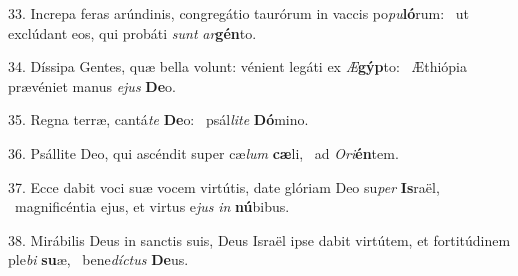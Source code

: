 33. Increpa feras arúndinis, congregátio taurórum in vaccis po\textit{pu}\textbf{ló}rum: \ast\  ut exclúdant eos, qui probáti \textit{sunt} \textit{ar}\textbf{gén}to.\

34. Díssipa Gentes, quæ bella volunt: vénient legáti ex \textit{Æ}\textbf{gýp}to: \ast\  Æthiópia prævéniet manus \textit{e}\textit{jus} \textbf{De}o.\

35. Regna terræ, cantá\textit{te} \textbf{De}o: \ast\  psál\textit{li}\textit{te} \textbf{Dó}mino.\

36. Psállite Deo, qui ascéndit super cæ\textit{lum} \textbf{cæ}li, \ast\  ad \textit{O}\textit{ri}\textbf{én}tem.\

37. Ecce dabit voci suæ vocem virtútis, date glóriam Deo su\textit{per} \textbf{Is}raël, \ast\  magnificéntia ejus, et virtus e\textit{jus} \textit{in} \textbf{nú}bibus.\

38. Mirábilis Deus in sanctis suis, Deus Israël ipse dabit virtútem, et fortitúdinem ple\textit{bi} \textbf{su}æ, \ast\  bene\textit{díc}\textit{tus} \textbf{De}us.\

